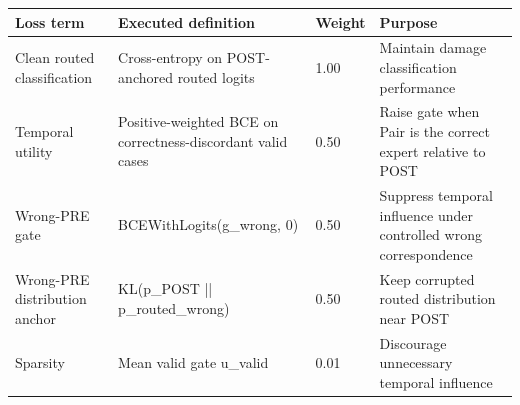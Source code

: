 \begin{tabular}{llll}
\toprule
Loss term & Executed definition & Weight & Purpose \\
\midrule
Clean routed classification & Cross-entropy on POST-anchored routed logits & 1.00 & Maintain damage classification performance \\
Temporal utility & Positive-weighted BCE on correctness-discordant valid cases & 0.50 & Raise gate when Pair is the correct expert relative to POST \\
Wrong-PRE gate & BCEWithLogits(g\_wrong, 0) & 0.50 & Suppress temporal influence under controlled wrong correspondence \\
Wrong-PRE distribution anchor & KL(p\_POST || p\_routed\_wrong) & 0.50 & Keep corrupted routed distribution near POST \\
Sparsity & Mean valid gate u\_valid & 0.01 & Discourage unnecessary temporal influence \\
\bottomrule
\end{tabular}
